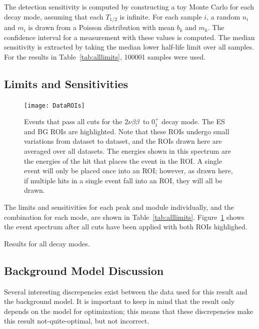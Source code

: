 \documentclass[notitlepage,rmp,aps,10pt]{revtex4-1}
\newcommand{\tnbb}{${2 \nu \beta \beta}$}
\newcommand{\SP}[3]{$#1^{#2}_{#3}$}
\begin{document}
The detection sensitivity is computed by constructing a toy Monte Carlo for each decay mode, assuming that each $T_{1/2}$ is infinite.
For each sample $i$, a random $n_i$ and $m_i$ is drawn from a Poisson distribution with mean $b_k$ and $m_k$.
The confidence interval for a measurement with these values is computed.
The median sensitivity is extracted by taking the median lower half-life limit over all samples.
For the results in Table~\ref{tab:alllimits}, 100001 samples were used.

\subsection{Limits and Sensitivities}
\begin{figure}[h]
  \centering
  \texttt{[image: DataROIs]}
  \caption[Measured events after all cuts with ROIs drawn]{\label{fig:roievents}
    Events that pass all cuts for the \tnbb\ to \SP{0}{+}{1} decay mode. The ES and BG ROIs are highlighted. Note that these ROIs undergo small variations from dataset to dataset, and the ROIs drawn here are averaged over all datasets. The energies shown in this spectrum are the energies of the hit that places the event in the ROI. A single event will only be placed once into an ROI; however, as drawn here, if multiple hits in a single event fall into an ROI, they will all be drawn.
  }
\end{figure}
The limits and sensitivities for each peak and module individually, and the combination for each mode, are shown in Table~\ref{tab:alllimits}.
Figure~\ref{fig:roievents} shows the event spectrum after all cuts have been applied with both ROIs highlighed.

\begin{table}[h]
  \scriptsize
  \centering
  
  \caption[Final results for all decay modes]{ \label{tab:alllimits}
    Results for all decay modes.
  }
\end{table}

\subsection{Background Model Discussion}
Several interesting discrepencies exist between the data used for this result and the background model.
It is important to keep in mind that the result only depends on the model for optimization; this means that these discrepencies make this result not-quite-optimal, but not incorrect.
\end{document}
